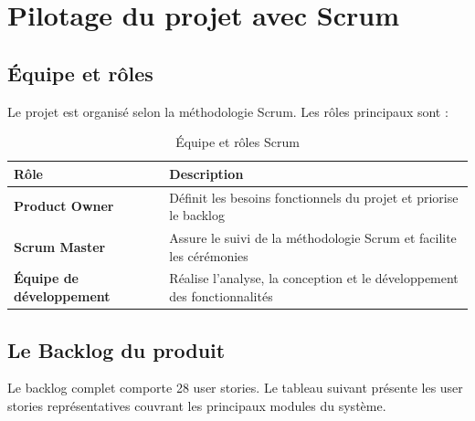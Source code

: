 \section{Pilotage du projet avec Scrum}

\subsection{Équipe et rôles}

Le projet est organisé selon la méthodologie Scrum. Les rôles principaux sont :

\begin{table}[H]
\centering
\caption{Équipe et rôles Scrum}
\label{tab:ch2:roles}
\begin{tabular}{|p{4.5cm}|p{10cm}|}
\hline
\textbf{Rôle} & \textbf{Description} \\
\hline
\textbf{Product Owner}
  & Définit les besoins fonctionnels du projet et priorise le backlog \\
\hline
\textbf{Scrum Master}
  & Assure le suivi de la méthodologie Scrum et facilite les cérémonies \\
\hline
\textbf{Équipe de développement}
  & Réalise l'analyse, la conception et le développement des fonctionnalités \\
\hline
\end{tabular}
\end{table}

\subsection{Le Backlog du produit}

Le backlog complet comporte 28 user stories. Le tableau suivant présente les user stories représentatives couvrant les principaux modules du système.

